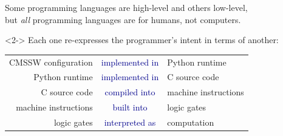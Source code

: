 \documentclass[aspectratio=169]{beamer}
\begin{document}
\begin{frame}{}
\Large
\vspace{1.25 cm}
\begin{center}
Some programming languages are high-level and others low-level, \\
but {\it all} programming languages are for humans, not computers.

\vspace{0.75 cm}
\begin{uncoverenv}<2->
Each one re-expresses the programmer's intent in terms of another:

\large
\vspace{0.25 cm}
\begin{tabular}{r c l}
CMSSW configuration & \textcolor{darkblue}{implemented in} & Python runtime \\
Python runtime & \textcolor{darkblue}{implemented in} & C source code \\
C source code & \textcolor{darkblue}{compiled into} & machine instructions \\
machine instructions & \textcolor{darkblue}{built into} & logic gates \\
logic gates & \textcolor{darkblue}{interpreted as} & computation
\end{tabular}
\end{uncoverenv}

\vspace{0.75 cm}
\end{center}
\end{frame}
\end{document}
